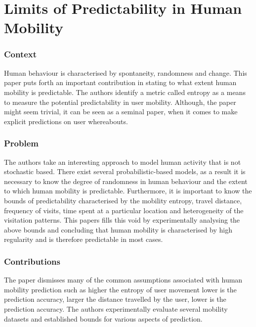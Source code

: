 \newpage
\section{Limits of Predictability in Human Mobility~\cite{Song1018}} \label{lect1}

\subsubsection*{Context}

Human behaviour is characterised by spontaneity, randomness and change. This paper puts
forth an important contribution in stating to what extent human mobility is predictable. 
The authors identify a metric called entropy as a means to measure the potential predictability
in user mobility. Although, the paper might seem trivial, it can be seen as a seminal paper,
when it comes to make explicit predictions on user whereabouts. 

\subsubsection*{Problem}

The authors take an interesting approach to model human activity that is not stochastic 
based. There exist several probabilistic-based models, as a result it is necessary to 
know the degree of randomness in human behaviour and the extent to which human mobility 
is predictable. Furthermore, it is important to know the bounds of predictability 
characterised by the mobility entropy, travel distance, frequency of visits, time spent 
at a particular location and heterogeneity of the visitation patterns. This papers fills this
void by experimentally analysing the above bounds and concluding that human mobility is 
characterised by high regularity and is therefore predictable in most cases.          

\subsubsection*{Contributions}

The paper dismisses many of the common assumptions associated with human mobility prediction such as
higher the entropy of user movement lower is the prediction accuracy, larger the distance
travelled by the user, lower is the prediction accuracy. The authors experimentally evaluate 
several mobility datasets and established bounds for various aspects of prediction.

